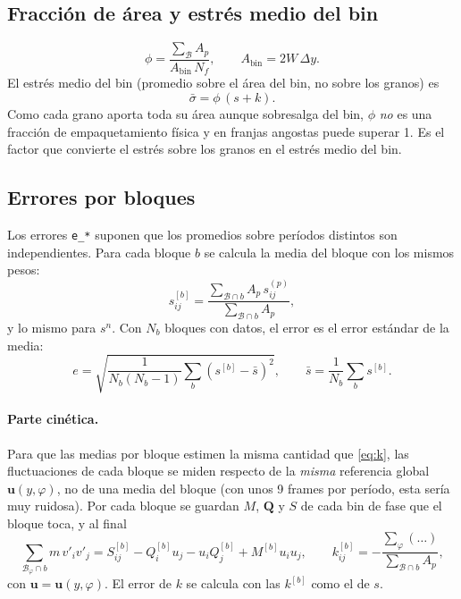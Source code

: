 \documentclass[11pt,a4paper]{article}
\newcommand{\vect}[1]{\mathbf{#1}}
\newcommand{\code}[1]{\texttt{#1}}
\begin{document}
\subsection{Fracción de área y estrés medio del bin}
\label{sec:phi}

\begin{equation}
  \phi = \frac{\sum_{\mathcal{B}} A_p}{A_\text{bin} \, N_f},
  \qquad A_\text{bin} = 2W \, \Delta y .
\end{equation}
El estrés medio del bin (promedio sobre el área del bin, no sobre los
granos) es
\begin{equation}
  \bar\sigma = \phi \, (s + k) .
\end{equation}
Como cada grano aporta toda su área aunque sobresalga del bin, $\phi$
\emph{no} es una fracción de empaquetamiento física y en franjas angostas
puede superar 1. Es el factor que convierte el estrés sobre los granos en
el estrés medio del bin.

\subsection{Errores por bloques}

Los errores \code{e\_*} suponen que los promedios sobre períodos distintos
son independientes. Para cada bloque $b$ se calcula la media del bloque
con los mismos pesos:
\begin{equation}
  s^{[b]}_{ij} = \frac{\sum_{\mathcal{B} \cap b} A_p \, s^{(p)}_{ij}}
                      {\sum_{\mathcal{B} \cap b} A_p},
\end{equation}
y lo mismo para $s^n$. Con $N_b$ bloques con datos, el error es el error
estándar de la media:
\begin{equation}
  e = \sqrt{\frac{1}{N_b (N_b - 1)} \sum_b \left(s^{[b]} - \bar s\right)^2},
  \qquad \bar s = \frac{1}{N_b} \sum_b s^{[b]} .
\end{equation}

\paragraph{Parte cinética.} Para que las medias por bloque estimen la
misma cantidad que \eqref{eq:k}, las fluctuaciones de cada bloque se miden
respecto de la \emph{misma} referencia global $\vect{u}(y, \varphi)$, no
de una media del bloque (con unos 9 frames por período, esta sería muy
ruidosa). Por cada bloque se guardan $M$, $\vect{Q}$ y $S$ de cada bin de
fase que el bloque toca, y al final
\begin{equation}
  \sum_{\mathcal{B}_\varphi \cap b} m \, v'_i v'_j
  = S^{[b]}_{ij} - Q^{[b]}_i u_j - u_i Q^{[b]}_j + M^{[b]} u_i u_j ,
  \qquad
  k^{[b]}_{ij} = -\frac{\sum_\varphi (\ldots)}{\sum_{\mathcal{B} \cap b} A_p},
\end{equation}
con $\vect{u} = \vect{u}(y, \varphi)$. El error de $k$ se calcula con las
$k^{[b]}$ como el de $s$.
\end{document}
